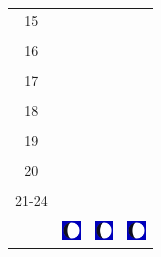 \documentclass[a4paper,12pt, tikz]{scrartcl}
\begin{document}
\begin{tabularx}{\linewidth}{|c|X|X|X|}
        &   &       &    \\
      \hline
      15&   &       &    \\
        &   &       &    \\
      \hline
      16&   &       &    \\
        &   &       &    \\
      \hline
      17&   &       &    \\
        &   &       &    \\
      \hline
      18&   &       &    \\
        &   &       &    \\
      \hline
      19&   &       &    \\
        &   &       &    \\
      \hline
      20&   &       &    \\
        &   &       &    \\
      \hline
      21-24&   &       &    \\
        &   &       &    \\
      \hline  
      & \vspace{0.01cm} \centerline{\includegraphics[width=0.5cm]{moon_phases/Moon_phase_3.svg.png}} \vspace{0.1cm} & \vspace{0.01cm} \centerline{\includegraphics[width=0.5cm]{moon_phases/Moon_phase_3.svg.png}} \vspace{0.1cm} & \vspace{0.01cm} \centerline{\includegraphics[width=0.5cm]{moon_phases/Moon_phase_3.svg.png}} \vspace{0.1cm}\\
      \hline   
    \end{tabularx}




    \newpage

        \noindent
\end{document}
